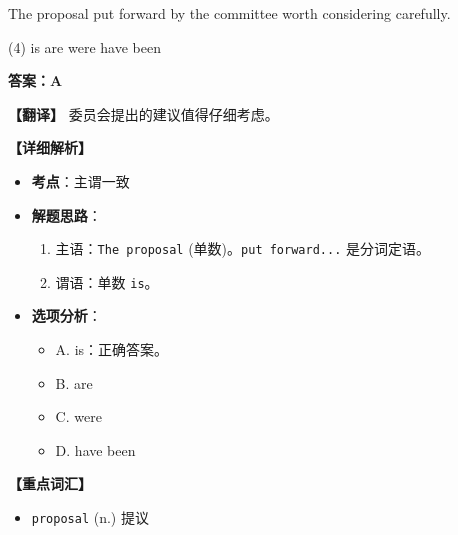 \documentclass[11pt, a4paper]{article}
\newcommand{\analysis}[4]{
    \begin{solutionbox}
        \textbf{答案：#1}
        
        \textbf{【翻译】} #2
        
        \textbf{【详细解析】}
        #3
        
        \textbf{【重点词汇】}
        #4
    \end{solutionbox}
}
\newcommand{\blank}{\underline{\hspace{1.5cm}}}
\begin{document}
\begin{questions}
    \item The proposal put forward by the committee \blank worth considering carefully.
    \begin{tasks}(4)
        \task is \task are \task were \task have been
    \end{tasks}
    \analysis{A}{委员会提出的建议值得仔细考虑。}{
        \begin{itemize}
            \item \textbf{考点}：主谓一致
            \item \textbf{解题思路}：
                \begin{enumerate}
                    \item 主语：\texttt{The proposal} (单数)。\texttt{put forward...} 是分词定语。
                    \item 谓语：单数 \texttt{is}。
                \end{enumerate}
            \item \textbf{选项分析}：
                \begin{itemize}
                    \item A. is：正确答案。
                    \item B. are
                    \item C. were
                    \item D. have been
                \end{itemize}
        \end{itemize}
    }{
        \begin{itemize}
            \item \texttt{proposal} (n.) 提议
        \end{itemize}
    }


\end{questions}
\end{document}
